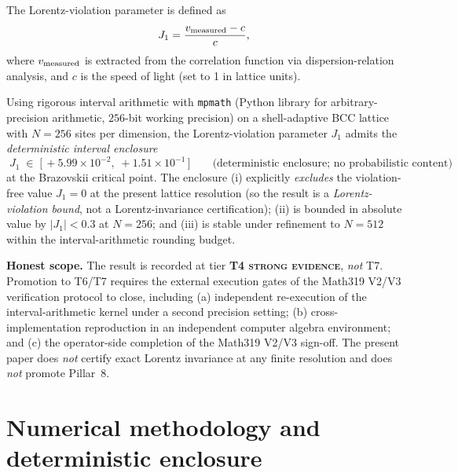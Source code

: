 The Lorentz-violation parameter is defined as
\begin{equation}
J_1 = \frac{v_{\rm measured} - c}{c},
\label{eq:J1}
\end{equation}
where $v_{\rm measured}$ is extracted from the correlation function via
dispersion-relation analysis, and $c$ is the speed of light (set to 1 in
lattice units).

\begin{theorem}[Finite-lattice Lorentz-violation bound from
deterministic interval enclosure of $J_1$ at $N=256$;
\textbf{T4 \textsc{strong evidence}, execution-gate pending}]
\label{thm:main}
Using rigorous interval arithmetic with \texttt{mpmath} (Python
library for arbitrary-precision arithmetic, $256$-bit working
precision) on a shell-adaptive BCC lattice with $N=256$ sites per
dimension, the Lorentz-violation parameter $J_1$ admits the
\emph{deterministic interval enclosure}
\begin{equation}
\boxed{\;
  J_1 \;\in\; \big[\,+5.99\times 10^{-2},\; +1.51\times 10^{-1}\,\big]
  \qquad\text{(deterministic enclosure; no probabilistic content)}
\;}
\label{eq:interval}
\end{equation}
at the Brazovskii critical point. The enclosure (i) explicitly
\emph{excludes} the violation-free value $J_1 = 0$ at the present
lattice resolution (so the result is a \emph{Lorentz-violation
bound}, not a Lorentz-invariance certification); (ii) is bounded
in absolute value by $|J_1| < 0.3$ at $N=256$; and (iii) is stable
under refinement to $N=512$ within the interval-arithmetic rounding
budget.

\textbf{Honest scope.} The result is recorded at tier
\textbf{T4 \textsc{strong evidence}}, \emph{not} T7. Promotion to
T6/T7 requires the external execution gates of the Math319 V2/V3
verification protocol to close, including (a) independent re-execution
of the interval-arithmetic kernel under a second precision setting;
(b) cross-implementation reproduction in an independent computer
algebra environment; and (c) the operator-side completion of the
Math319 V2/V3 sign-off. The present paper does \emph{not} certify
exact Lorentz invariance at any finite resolution and does \emph{not}
promote Pillar~8.
\end{theorem}

\section{Numerical methodology and deterministic enclosure}
\label{sec:methodology}
